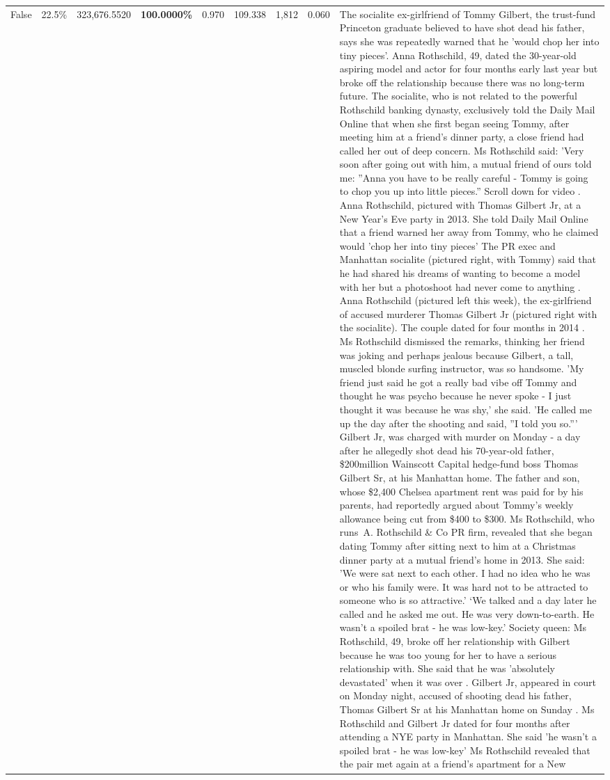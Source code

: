\begin{table}[H]
\begin{tabular}{lllrlllll}
False & 22.5\% & 323,676.5520 & \bfseries \color{red} 100.0000\% & 0.970 & 109.338 & 1,812 & 0.060 & The socialite ex-girlfriend of Tommy Gilbert, the trust-fund Princeton graduate believed to have shot dead his father, says she was repeatedly warned that he 'would chop her into tiny pieces'. Anna Rothschild, 49, dated the 30-year-old aspiring model and actor for four months early last year but broke off the relationship because there was no long-term future. The socialite, who is not related to the powerful Rothschild banking dynasty, exclusively told the Daily Mail Online that when she first began seeing Tommy, after meeting him at a friend's dinner party, a close friend had called her out of deep concern. Ms Rothschild said: 'Very soon after going out with him, a mutual friend of ours told me: ''Anna you have to be really careful - Tommy is going to chop you up into little pieces.'' Scroll down for video . Anna Rothschild, pictured with Thomas Gilbert Jr, at a New Year's Eve party in 2013. She told Daily Mail Online that a friend warned her away from Tommy, who he claimed would 'chop her into tiny pieces' The PR exec and Manhattan socialite (pictured right, with Tommy) said that he had shared his dreams of wanting to become a model with her but a photoshoot had never come to anything . Anna Rothschild (pictured left this week), the ex-girlfriend of accused murderer Thomas Gilbert Jr (pictured right with the socialite). The couple dated for four months in 2014 . Ms Rothschild dismissed the remarks, thinking her friend was joking and perhaps jealous because Gilbert, a tall, muscled blonde surfing instructor, was so handsome. 'My friend just said he got a really bad vibe off Tommy and thought he was psycho because he never spoke - I just thought it was because he was shy,' she said. 'He called me up the day after the shooting and said, ''I told you so.''' Gilbert Jr, was charged with murder on Monday - a day after he allegedly shot dead his 70-year-old father, \$200million Wainscott Capital hedge-fund boss Thomas Gilbert Sr, at his Manhattan home. The father and son, whose \$2,400 Chelsea apartment rent was paid for by his parents, had reportedly argued about Tommy's weekly allowance being cut from \$400 to \$300. Ms Rothschild, who runs A. Rothschild \& Co PR firm, revealed that she began dating Tommy after sitting next to him at a Christmas dinner party at a mutual friend's home in 2013. She said: 'We were sat next to each other. I had no idea who he was or who his family were. It was hard not to be attracted to someone who is so attractive.' ‘We talked and a day later he called and he asked me out. He was very down-to-earth. He wasn’t a spoiled brat - he was low-key.’ Society queen: Ms Rothschild, 49, broke off her relationship with Gilbert because he was too young for her to have a serious relationship with. She said that he was 'absolutely devastated' when it was over . Gilbert Jr, appeared in court on Monday night, accused of shooting dead his father, Thomas Gilbert Sr at his Manhattan home on Sunday . Ms Rothschild and Gilbert Jr dated for four months after attending a NYE party in Manhattan. She said 'he wasn't a spoiled brat - he was low-key' Ms Rothschild revealed that the pair met again at a friend’s apartment for a New 
\end{tabular}
\end{table}
